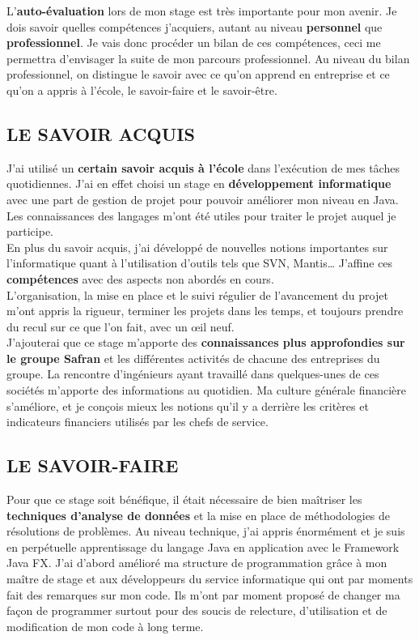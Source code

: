 L’\textbf{auto-évaluation} lors de mon stage est très importante pour mon avenir. Je dois savoir quelles compétences j’acquiers, autant au niveau \textbf{personnel} que \textbf{professionnel}. Je vais donc procéder un bilan de ces compétences, ceci me permettra d’envisager la suite de mon parcours professionnel. Au niveau du bilan professionnel, on distingue le savoir avec ce qu’on apprend en entreprise et ce qu’on a appris à l’école, le savoir-faire et le savoir-être.\\

\subsection{LE SAVOIR ACQUIS}
J’ai utilisé un \textbf{certain savoir acquis à l’école} dans l’exécution de mes tâches quotidiennes. J’ai en effet choisi un stage en\textbf{ développement informatique} avec une part de gestion de projet pour pouvoir améliorer mon niveau en Java. Les connaissances des langages m’ont été utiles pour traiter le projet auquel je participe.\\

En plus du savoir acquis, j’ai développé de nouvelles notions importantes sur l’informatique quant à l’utilisation d’outils tels que SVN, Mantis… J’affine ces \textbf{compétences} avec des aspects non abordés en cours.\\

L’organisation, la mise en place et le suivi régulier de l’avancement du projet m’ont appris la rigueur, terminer les projets dans les temps, et toujours prendre du recul sur ce que l’on fait, avec un œil neuf.\\

J’ajouterai que ce stage m’apporte des \textbf{connaissances plus approfondies sur le groupe Safran} et les différentes activités de chacune des entreprises du groupe. La rencontre d’ingénieurs ayant travaillé dans quelques-unes de ces sociétés m’apporte des informations au quotidien. Ma culture générale financière s’améliore, et je conçois mieux les notions qu’il y a derrière les critères et indicateurs financiers utilisés par les chefs de service.\\

\subsection{LE SAVOIR-FAIRE}

Pour que ce stage soit bénéfique, il était nécessaire de bien maîtriser les \textbf{techniques d’analyse de données} et la mise en place de méthodologies de résolutions de problèmes. Au niveau technique, j’ai appris énormément et je suis en perpétuelle apprentissage du langage Java en application avec le Framework Java FX. J’ai d’abord amélioré ma structure de programmation grâce à mon maître de stage et aux développeurs du service informatique qui ont par moments fait des remarques sur mon code. Ils m’ont par moment proposé de changer ma façon de programmer surtout pour des soucis de relecture, d’utilisation et de modification de mon code à long terme.\\

